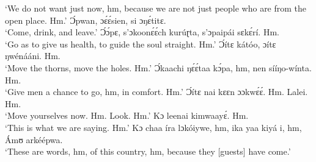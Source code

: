 \documentclass[output=paper,colorlinks,citecolor=brown]{langscibook}
\begin{document}
            `We do not want just now, hm, because we are not just people who are from the open place. Hm.'
    \ex     Ɔ́pwan, ɔɛ́ɛ́sien, si ɔŋɛ́titɛ.\\
            `Come, drink, and leave.'
    \ex     Ɔ́ɔ́pɛ, s’ɔkoonɛ́ɛ́ch kurúɽta, s’ɔpaipái sɛkɛ́rí. Hm.\\
            `Go as to give us health, to guide the soul straight. Hm.'
    \ex     Ɔ́ítɛ kátóo, ɔítɛ ŋwénááni. Hm.\\
            `Move the thorns, move the holes. Hm.'
    \ex     Ɔ́kaachi ŋɛ́ɛ́taa kɔ́pa, hm, nen sííŋo-wínta. Hm.\\
            `Give men a chance to go, hm, in comfort. Hm.'
    \ex     Ɔ́ítɛ nai kɛɛn ɔɔkwɛ́ɛ́. Hm. Lalei. Hm.\\
            `Move yourselves now. Hm. Look. Hm.'
    \ex     Kɔ leenai kimwaayɛ́. Hm.\\
            `This is what we are saying. Hm.'
    \ex     Kɔ chaa íra lɔkóiywe, hm, ika yaa kiyá i, hm, Ámʊ arkéépwa.\\
            `These are words, hm, of this country, hm, because they [guests] have come.'
    \z
\z


 
\end{document}

